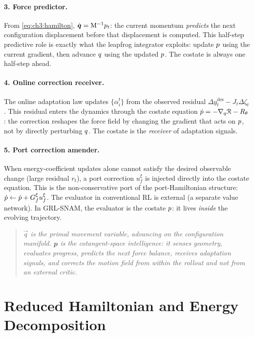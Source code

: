 \paragraph{3. Force predictor.}
From \eqref{eq:ch3:hamilton}, $\dot{\boldsymbol{q}} = \mathrm{M}^{-1}p_t$:
the current momentum \emph{predicts} the next configuration
displacement before that displacement is computed.
This half-step predictive role is exactly what the leapfrog
integrator exploits: update $p$ using the current gradient,
then advance $q$ using the updated $p$.
The costate is always one half-step ahead.

\paragraph{4. Online correction receiver.}
The online adaptation law updates $\{\alpha_i^t\}$ from the observed
residual $\Delta y^{\mathrm{des}}_t - J_t\Delta\zeta_t$.
This residual enters the dynamics through the costate equation
$\dot{p} = -\nabla_{q}\mathcal{R} - R_\theta$:
the correction reshapes the force field by changing the gradient
that acts on $p$, not by directly perturbing $q$.
The costate is the \emph{receiver} of adaptation signals.

\paragraph{5. Port correction amender.}
When energy-coefficient updates alone cannot satisfy the desired
observable change (large residual $r_t$), a port correction
$u_f^\xi$ is injected directly into the costate equation.
This is the non-conservative port of the port-Hamiltonian structure:
$\dot{p} \leftarrow \dot{p} + G_f^\xi u_f^\xi$.
The evaluator in conventional RL is external (a separate value
network).
In GRL-SNAM, the evaluator is the costate $p$: it lives
\emph{inside} the evolving trajectory.

\begin{quote}\itshape
$\vec{q}$ is the primal movement variable, advancing on the
configuration manifold.
$p$ is the cotangent-space intelligence: it senses geometry,
evaluates progress, predicts the next force balance, receives
adaptation signals, and corrects the motion field from within
the rollout and not from an external critic.
\end{quote}

\section{Reduced Hamiltonian and Energy Decomposition}
\label{sec:ch3:hamiltonian}

